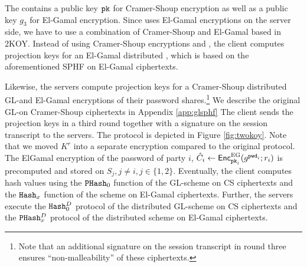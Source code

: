 The \crs contains a public key $\mathtt{pk}$ for Cramer-Shoup encryption as well as a public key $g_3$ for El-Gamal encryption.
Since \cite{Katz_MacKenzie_Taban_Gligor_2005} uses El-Gamal encryptions on the server side, we have to use a combination of Cramer-Shoup and El-Gamal based \SPHFF in 2KOY.
Instead of using Cramer-Shoup encryptions and \SPHFF, the client computes projection keys for an El-Gamal distributed \SPHFF, which is based on the aforementioned SPHF on El-Gamal ciphertexts.

Likewise, the servers compute projection keys for a Cramer-Shoup distributed GL-\SPHFF and El-Gamal encryptions of their password shares.\footnote{Note that an additional signature on the session transcript in round three ensures ``non-malleability'' of these ciphertexts.}
We describe the original GL-\SPHF on Cramer-Shoup ciphertexts in Appendix \ref{app:glsphf}
The client sends the projection keys in a third round together with a signature on the session transcript to the servers.
The protocol is depicted in Figure \ref{fig:twokoy}.
Note that we moved $K^r$ into a separate encryption compared to the original protocol.
The ElGamal encryption of the password of party $i$, $\hat{C}_i\gets\mathsf{Enc}^\mathrm{EG}_{\mathtt{pk}_i}(g^{\mathtt{pwd}_i};r_i)$ is precomputed and stored on $S_{j},j\not=i,j\in\{1,2\}$.
Eventually, the client computes hash values using the $\mathtt{PHash}_0$ function of the GL-\SPHFF scheme on CS ciphertexts and the $\mathtt{Hash}_x$ function of the \SPHFF scheme on El-Gamal ciphertexts.
Further, the servers execute the $\mathtt{Hash}_0^D$ protocol of the distributed GL-\SPHFF scheme on CS ciphertexts and the $\mathtt{PHash}_x^D$ protocol of the distributed \SPHFF scheme on El-Gamal ciphertexts.


